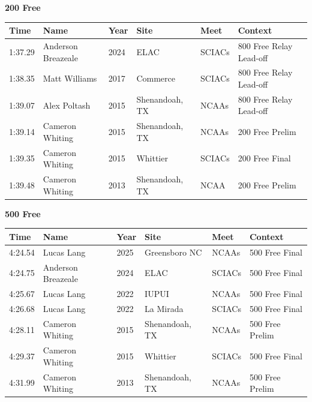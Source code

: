 \vspace{1.2em}
\noindent\begin{minipage}[t]{0.98\textwidth}
\centering
\textbf{\textcolor{teamprimary}{200 Free}}\par
\vspace{0.5em}
\centering
\small
\renewcommand{\arraystretch}{1.0}
\setlength{\tabcolsep}{4pt}
\begin{tabular}{@{}p{2.0cm}p{3.2cm}p{1.2cm}p{2.0cm}p{2.0cm}p{2.5cm}@{}}
\toprule
\textbf{Time} & \textbf{Name} & \textbf{Year} & \textbf{Site} & \textbf{Meet} & \textbf{Context} \\
\midrule
1:37.29 & Anderson Breazeale & 2024 & ELAC & SCIACs & 800 Free Relay Lead-off \\
1:38.35 & Matt Williams & 2017 & Commerce & SCIACs & 800 Free Relay Lead-off \\
1:39.07 & Alex Poltash & 2015 & Shenandoah, TX & NCAAs & 800 Free Relay Lead-off \\
1:39.14 & Cameron Whiting & 2015 & Shenandoah, TX & NCAAs & 200 Free Prelim \\
1:39.35 & Cameron Whiting & 2015 & Whittier & SCIACs & 200 Free Final \\
1:39.48 & Cameron Whiting & 2013 & Shenandoah, TX & NCAA & 200 Free Prelim \\
\bottomrule
\end{tabular}
\end{minipage}
\vspace{1.2em}
\noindent\begin{minipage}[t]{0.98\textwidth}
\centering
\textbf{\textcolor{teamprimary}{500 Free}}\par
\vspace{0.5em}
\centering
\small
\renewcommand{\arraystretch}{1.0}
\setlength{\tabcolsep}{4pt}
\begin{tabular}{@{}p{2.0cm}p{3.2cm}p{1.2cm}p{2.0cm}p{2.0cm}p{2.5cm}@{}}
\toprule
\textbf{Time} & \textbf{Name} & \textbf{Year} & \textbf{Site} & \textbf{Meet} & \textbf{Context} \\
\midrule
4:24.54 & Lucas Lang & 2025 & Greensboro NC & NCAAs & 500 Free Final \\
4:24.75 & Anderson Breazeale & 2024 & ELAC & SCIACs & 500 Free Final \\
4:25.67 & Lucas Lang & 2022 & IUPUI & NCAAs & 500 Free Final \\
4:26.68 & Lucas Lang & 2022 & La Mirada & SCIACs & 500 Free Final \\
4:28.11 & Cameron Whiting & 2015 & Shenandoah, TX & NCAAs & 500 Free Prelim \\
4:29.37 & Cameron Whiting & 2015 & Whittier & SCIACs & 500 Free Final \\
4:31.99 & Cameron Whiting & 2013 & Shenandoah, TX & NCAAs & 500 Free Prelim \\
\bottomrule
\end{tabular}
\end{minipage}
